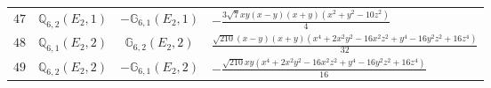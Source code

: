 \documentclass[fleqn,8pt,landscape]{jsarticle}
\begin{document}
\begin{table}[ht!]
\begin{center}
\begin{tabular}{cccl}
$ 47 $ & $ \mathbb{Q}_{6,2}(E_{2},1) $ & $ -\mathbb{G}_{6,1}(E_{2},1) $ & $ - \frac{3 \sqrt{7} x y \left(x - y\right) \left(x + y\right) \left(x^{2} + y^{2} - 10 z^{2}\right)}{4} $ \\
$ 48 $ & $ \mathbb{Q}_{6,1}(E_{2},2) $ & $ \mathbb{G}_{6,2}(E_{2},2) $ & $ \frac{\sqrt{210} \left(x - y\right) \left(x + y\right) \left(x^{4} + 2 x^{2} y^{2} - 16 x^{2} z^{2} + y^{4} - 16 y^{2} z^{2} + 16 z^{4}\right)}{32} $ \\
$ 49 $ & $ \mathbb{Q}_{6,2}(E_{2},2) $ & $ -\mathbb{G}_{6,1}(E_{2},2) $ & $ - \frac{\sqrt{210} x y \left(x^{4} + 2 x^{2} y^{2} - 16 x^{2} z^{2} + y^{4} - 16 y^{2} z^{2} + 16 z^{4}\right)}{16} $ \\
 \hline \hline
\end{tabular}
\end{center}
\end{table}
\end{document}
